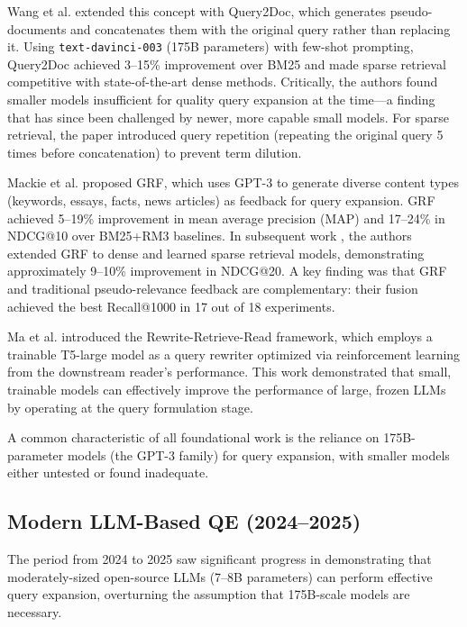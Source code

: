 Wang et al. \cite{wang_2023_query2doc} extended this concept with Query2Doc, which generates pseudo-documents and concatenates them with the original query rather than replacing it. Using \texttt{text-davinci-003} (175B parameters) with few-shot prompting, Query2Doc achieved 3--15\% improvement over BM25 and made sparse retrieval competitive with state-of-the-art dense methods. Critically, the authors found smaller models insufficient for quality query expansion at the time---a finding that has since been challenged by newer, more capable small models. For sparse retrieval, the paper introduced query repetition (repeating the original query 5 times before concatenation) to prevent term dilution.

Mackie et al. \cite{mackie_2023_grf} proposed GRF, which uses GPT-3 to generate diverse content types (keywords, essays, facts, news articles) as feedback for query expansion. GRF achieved 5--19\% improvement in mean average precision (MAP) and 17--24\% in NDCG@10 over BM25+RM3 baselines. In subsequent work \cite{mackie_2023_grf_dense}, the authors extended GRF to dense and learned sparse retrieval models, demonstrating approximately 9--10\% improvement in NDCG@20. A key finding was that GRF and traditional pseudo-relevance feedback are complementary: their fusion achieved the best Recall@1000 in 17 out of 18 experiments.

Ma et al. \cite{ma_2023_query} introduced the Rewrite-Retrieve-Read framework, which employs a trainable T5-large model as a query rewriter optimized via reinforcement learning from the downstream reader's performance. This work demonstrated that small, trainable models can effectively improve the performance of large, frozen LLMs by operating at the query formulation stage.

A common characteristic of all foundational work is the reliance on 175B-parameter models (the GPT-3 family) for query expansion, with smaller models either untested or found inadequate.

\subsection{Modern LLM-Based QE (2024--2025)}
\label{sec:modern_qe}

The period from 2024 to 2025 saw significant progress in demonstrating that moderately-sized open-source LLMs (7--8B parameters) can perform effective query expansion, overturning the assumption that 175B-scale models are necessary.

